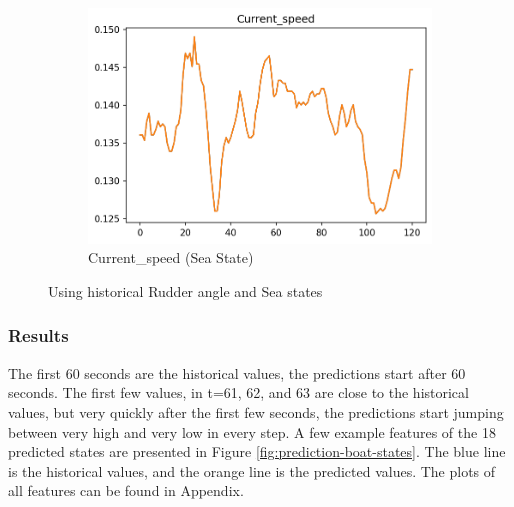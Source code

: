 \documentclass[12pt,twoside]{report}
\begin{document}
\begin{figure}[h]
\begin{subfigure}[b]{0.32\textwidth}
         \includegraphics[width=\textwidth]{figures/prediction-plots/Current_speed.png}
         \caption{Current\_speed (Sea State)}
     \end{subfigure}
        \caption{Using historical Rudder angle and Sea states}
        \label{fig:prediction-sea-rudder}
\end{figure}

\subsubsection{Results}
The first 60 seconds are the historical values, the predictions start after 60 seconds. The first few values, in t=61, 62, and 63 are close to the historical values, but very quickly after the first few seconds, the predictions start jumping between very high and very low in every step. A few example features of the 18 predicted states are presented in Figure \ref{fig:prediction-boat-states}. The blue line is the historical values, and the orange line is the predicted values. The plots of all features can be found in Appendix.
\end{document}
